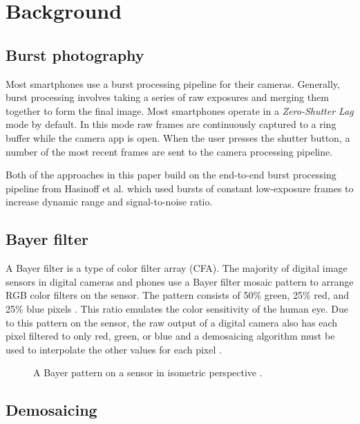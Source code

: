 \documentclass{sig-alternate}
\begin{document}
\section{Background}

\subsection{Burst photography}

Most smartphones use a burst processing pipeline for their cameras. Generally, burst processing involves taking a series of raw exposures and merging them together to form the final image. Most smartphones operate in a \emph{Zero-Shutter Lag} mode by default. In this mode raw frames are continuously captured to a ring buffer while the camera app is open. When the user presses the shutter button, a number of the most recent frames are sent to the camera processing pipeline.

Both of the approaches in this paper build on the end-to-end burst processing pipeline from Hasinoff et al. \cite{Hasinoff2016} which used bursts of constant low-exposure frames to increase dynamic range and signal-to-noise ratio.

\newpage

\subsection{Bayer filter}

A Bayer filter is a type of color filter array (CFA). The majority of digital image sensors in digital cameras and phones use a Bayer filter mosaic pattern to arrange RGB color filters on the sensor. The pattern consists of 50\% green, 25\% red, and 25\% blue pixels \cite{wiki:BayerFilter}. This ratio emulates the color sensitivity of the human eye. Due to this pattern on the sensor, the raw output of a digital camera also has each pixel filtered to only red, green, or blue and a demosaicing algorithm must be used to interpolate the other values for each pixel \cite{wiki:BayerFilter}.

\begin{figure}
\centering
{}
\caption{A Bayer pattern on a sensor in isometric perspective \cite{wiki:BayerFilter}.}
\label{fig:BayerPattern}
\end{figure}

\subsection{Demosaicing}
\end{document}
